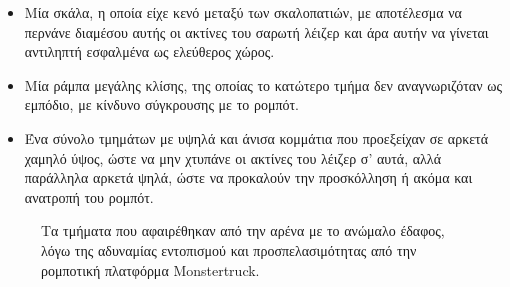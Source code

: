 \begin{itemize}
	\item Μία σκάλα, η οποία είχε κενό μεταξύ των σκαλοπατιών, με αποτέλεσμα να περνάνε διαμέσου αυτής οι ακτίνες του σαρωτή λέιζερ και άρα αυτήν να γίνεται αντιληπτή εσφαλμένα ως ελεύθερος χώρος.
	\item Μία ράμπα μεγάλης κλίσης, της οποίας το κατώτερο τμήμα δεν αναγνωριζόταν ως εμπόδιο, με κίνδυνο σύγκρουσης με το ρομπότ.
	\item Ένα σύνολο τμημάτων με υψηλά και άνισα κομμάτια που προεξείχαν σε αρκετά χαμηλό ύψος, ώστε να μην χτυπάνε οι ακτίνες του λέιζερ σ' αυτά, αλλά παράλληλα αρκετά ψηλά, ώστε να προκαλούν την προσκόλληση ή ακόμα και ανατροπή του ρομπότ.
\end{itemize}

\begin{figure}[!ht]
	\hspace{0.01\linewidth}
	\hspace{0.01\linewidth}
	\caption{Τα τμήματα που αφαιρέθηκαν από την αρένα με το ανώμαλο έδαφος, λόγω της αδυναμίας εντοπισμού και προσπελασιμότητας από την ρομποτική πλατφόρμα Monstertruck.}
	\label{fig:removed_parts_from_robocup_arena}
\end{figure}

